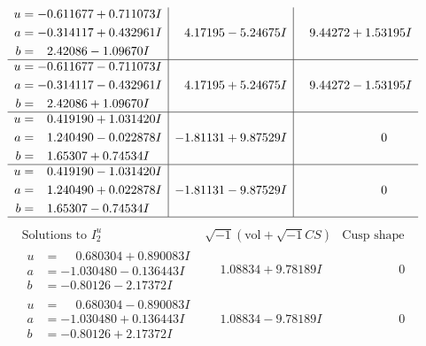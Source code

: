 \documentclass[1p]{elsarticle_modified}
\theoremstyle{definition}
\newcommand{\I}{\sqrt{-1}}
\begin{document}
$$\begin{array}{c|c|c}
\begin{aligned}
u &= -0.611677 + 0.711073 I \\
a &= -0.314117 + 0.432961 I \\
b &= \phantom{-}2.42086 - 1.09670 I\end{aligned}
 & \phantom{-}4.17195 - 5.24675 I & \phantom{-}9.44272 + 1.53195 I \\ \hline\begin{aligned}
u &= -0.611677 - 0.711073 I \\
a &= -0.314117 - 0.432961 I \\
b &= \phantom{-}2.42086 + 1.09670 I\end{aligned}
 & \phantom{-}4.17195 + 5.24675 I & \phantom{-}9.44272 - 1.53195 I \\ \hline\begin{aligned}
u &= \phantom{-}0.419190 + 1.031420 I \\
a &= \phantom{-}1.240490 - 0.022878 I \\
b &= \phantom{-}1.65307 + 0.74534 I\end{aligned}
 & -1.81131 + 9.87529 I & \phantom{-0.000000 } 0 \\ \hline\begin{aligned}
u &= \phantom{-}0.419190 - 1.031420 I \\
a &= \phantom{-}1.240490 + 0.022878 I \\
b &= \phantom{-}1.65307 - 0.74534 I\end{aligned}
 & -1.81131 - 9.87529 I & \phantom{-0.000000 } 0\\
 \hline 
 \end{array}$$\newpage$$\begin{array}{c|c|c}  
\text{Solutions to }I^u_{2}& \I (\text{vol} + \sqrt{-1}CS) & \text{Cusp shape}\\
 \hline 
\begin{aligned}
u &= \phantom{-}0.680304 + 0.890083 I \\
a &= -1.030480 - 0.136443 I \\
b &= -0.80126 - 2.17372 I\end{aligned}
 & \phantom{-}1.08834 + 9.78189 I & \phantom{-0.000000 } 0 \\ \hline\begin{aligned}
u &= \phantom{-}0.680304 - 0.890083 I \\
a &= -1.030480 + 0.136443 I \\
b &= -0.80126 + 2.17372 I\end{aligned}
 & \phantom{-}1.08834 - 9.78189 I & \phantom{-0.000000 } 0 \\ \hline\begin{aligned}

\end{aligned}
\end{array}$$
\end{document}
